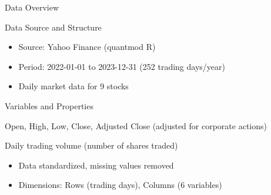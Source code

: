 \documentclass{beamer}
\begin{document}
\begin{frame}{Data Overview}

    \begin{block}{Data Source and Structure}
        \begin{itemize}
            \item Source: Yahoo Finance (quantmod R)
            \item Period: 2022-01-01 to 2023-12-31 (252 trading days/year)
            \item Daily market data for 9 stocks
        \end{itemize}
    \end{block}

    \begin{block}{Variables and Properties}
        \begin{description}\setlength{\itemsep}{1pt}
            \item[Price] Open, High, Low, Close, Adjusted Close (adjusted for corporate actions)
            \item[Volume] Daily trading volume (number of shares traded)
        \end{description}
        \vspace{4mm}
        \begin{itemize}
            \item Data standardized, missing values removed
            \item Dimensions: Rows (trading days), Columns (6 variables)
        \end{itemize}
    \end{block}


\end{frame}
\end{document}
